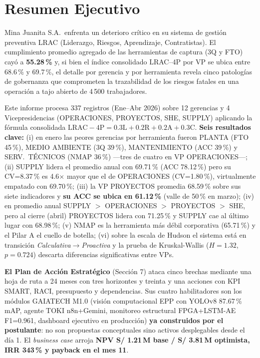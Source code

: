 \documentclass[12pt,a4paper]{article}
\begin{document}
\section{Resumen Ejecutivo}

Mina Juanita S.A.\ enfrenta un deterioro crítico en su sistema de gestión preventiva LRAC (Liderazgo, Riesgos, Aprendizaje, Contratistas). El cumplimiento promedio agregado de las herramientas de captura (3Q y FTO) cayó a \textbf{55.28\,\%} y, si bien el índice consolidado LRAC--4P por VP se ubica entre 68.6\,\% y 69.7\,\%, el detalle por gerencia y por herramienta revela cinco patologías de gobernanza que comprometen la trazabilidad de los riesgos fatales en una operación a tajo abierto de 4\,500 trabajadores.

Este informe procesa 337 registros (Ene--Abr 2026) sobre 12 gerencias y 4 Vicepresidencias (OPERACIONES, PROYECTOS, SHE, SUPPLY) aplicando la fórmula consolidada $\mathrm{LRAC{-}4P}=0.3\mathrm{L}+0.2\mathrm{R}+0.2\mathrm{A}+0.3\mathrm{C}$. \textbf{Seis resultados clave:} (i) en enero las peores gerencias por herramienta fueron PLANTA (FTO 45\,\%), MEDIO AMBIENTE (3Q 39\,\%), MANTENIMIENTO (ACC 39\,\%) y SERV.\ TÉCNICOS (NMAP 36\,\%) ---tres de cuatro en VP OPERACIONES---; (ii) SUPPLY lidera el promedio anual con 69.71\,\% (ACC 78.12\,\%) pero su CV=8.37\,\% es 4.6$\times$ mayor que el de OPERACIONES (CV=1.80\,\%), virtualmente empatado con 69.70\,\%; (iii) la VP PROYECTOS promedia 68.59\,\% sobre sus siete indicadores y \textbf{su ACC se ubica en 61.12\,\%} (valle de 50\,\% en marzo); (iv) en promedio anual SUPPLY $>$ OPERACIONES $>$ PROYECTOS $>$ SHE, pero al cierre (abril) PROYECTOS lidera con 71.25\,\% y SUPPLY cae al último lugar con 68.98\,\%; (v) NMAP es la herramienta más débil corporativa (65.71\,\%) y el Pilar A el cuello de botella; (vi) sobre la escala de Hudson el sistema está en transición \emph{Calculativa$\to$Proactiva} y la prueba de Kruskal-Wallis ($H=1.32$, $p=0.724$) descarta diferencias significativas entre VPs.

\textbf{El Plan de Acción Estratégico} (Sección 7) ataca cinco brechas mediante una hoja de ruta a 24 meses con tres horizontes y treinta y una acciones con KPI SMART, RACI, presupuesto y dependencias. Sus cuatro habilitadores son los módulos GAIATECH M1.0 (visión computacional EPP con YOLOv8 87.67\,\% mAP, agente TOKI n8n+Gemini, monitoreo estructural FPGA+LSTM-AE F1=0.961, dashboard ejecutivo en producción) \textbf{ya construidos por el postulante}: no son propuestas conceptuales sino activos desplegables desde el día 1. El \emph{business case} arroja \textbf{NPV S/ 1.21\,M base / S/ 3.81\,M optimista, IRR 343\,\% y payback en el mes 11}.
\end{document}
